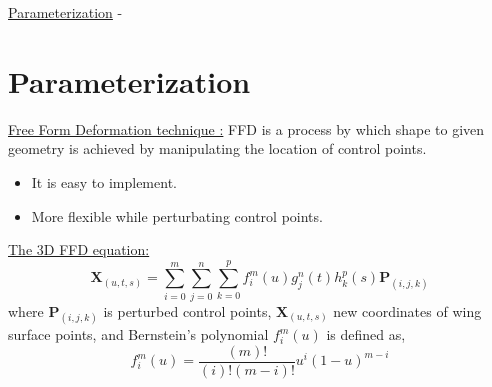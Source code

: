 \begin{frame}[allowframebreaks]{\underline{Parameterization} -}
    \section{Parameterization}
    
\underline{Free Form Deformation technique :} FFD is a process by which shape to given geometry is achieved by manipulating the
location of control points. 
\begin{itemize}
\item It is easy to implement.
\item  More flexible while perturbating control points.
\end{itemize}
\vspace{1mm}
\underline{The 3D FFD equation:} 
  \begin{equation}
\mathbf{X}_{(u, t, s)}=\sum_{i=0}^{m} \sum_{j=0}^{n} \sum_{k=0}^{p} f_{i}^{m}(u) g_{j}^{n}(t) h_{k}^{p}(s) \mathbf{P}_{(i, j, k)}
\label{ffd_3d}
\end{equation}
where $\mathbf{P}_{(i, j, k)}$ is perturbed control points, $\mathbf{X}_{(u, t, s)}$ new coordinates of wing surface points, and Bernstein's polynomial $f_{i}^{m}(u)$ is defined as,
\begin{equation}
f_{i}^{m}(u)=\frac{(m) !}{(i) !(m-i) !} u^{i}(1-u)^{m-i}
\label{bernstein_poly}
\end{equation}


\end{frame}
